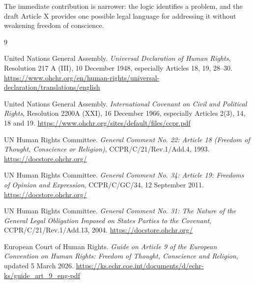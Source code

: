 \documentclass[11pt,a4paper]{article}
\begin{document}
The immediate contribution is narrower: the logic identifies a problem, and the draft Article X provides one possible legal language for addressing it without weakening freedom of conscience.

\begin{thebibliography}{9}

United Nations General Assembly.
\emph{Universal Declaration of Human Rights}, Resolution 217 A (III), 10 December 1948, especially Articles 18, 19, 28--30.
\url{https://www.ohchr.org/en/human-rights/universal-declaration/translations/english}

United Nations General Assembly.
\emph{International Covenant on Civil and Political Rights}, Resolution 2200A (XXI), 16 December 1966, especially Articles 2(3), 14, 18 and 19.
\url{https://www.ohchr.org/sites/default/files/ccpr.pdf}

UN Human Rights Committee.
\emph{General Comment No. 22: Article 18 (Freedom of Thought, Conscience or Religion)}, CCPR/C/21/Rev.1/Add.4, 1993.
\url{https://docstore.ohchr.org/}

UN Human Rights Committee.
\emph{General Comment No. 34: Article 19: Freedoms of Opinion and Expression}, CCPR/C/GC/34, 12 September 2011.
\url{https://docstore.ohchr.org/}

UN Human Rights Committee.
\emph{General Comment No. 31: The Nature of the General Legal Obligation Imposed on States Parties to the Covenant}, CCPR/C/21/Rev.1/Add.13, 2004.
\url{https://docstore.ohchr.org/}

European Court of Human Rights.
\emph{Guide on Article 9 of the European Convention on Human Rights: Freedom of Thought, Conscience and Religion}, updated 5 March 2026.
\url{https://ks.echr.coe.int/documents/d/echr-ks/guide_art_9_eng-pdf}

\end{thebibliography}
\end{document}
